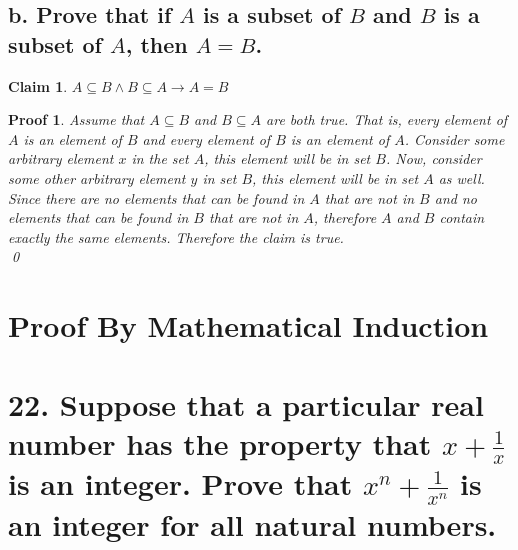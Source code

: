 \documentclass{article}
\newtheorem*{claim}{Claim}
\newtheorem*{poof}{Proof}
\begin{document}
\subsection*{b. Prove that if $A$ is a subset of $B$ and $B$ is a subset of $A$, then $A=B$.}
\begin{claim}
    $A \subseteq B \wedge B \subseteq A \rightarrow A = B$
\end{claim}
\begin{poof}
    Assume that $A \subseteq B$ and $B \subseteq A$ are both true. That is, every element of $A$ is an element of $B$ and every element of $B$ is an element of $A$. Consider some arbitrary element $x$ in the set $A$, this element will be in set $B$. Now, consider some other arbitrary element $y$ in set $B$, this element will be in set $A$ as well. Since there are no elements that can be found in $A$ that are not in $B$ and no elements that can be found in $B$ that are not in $A$, therefore $A$ and $B$ contain exactly the same elements. Therefore the claim is true. \\ 
    \qed\end{poof}
\newpage
\section*{Proof By Mathematical Induction}
\section*{22. Suppose that a particular real number 
 has the property that $x+\frac{1}{x}$ is an integer. Prove that $x^n+\frac{1}{x^n}$ is an integer for all natural numbers.}
\end{document}
